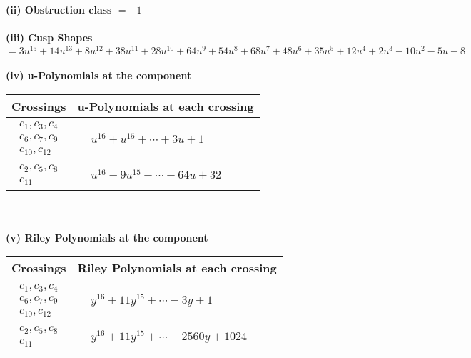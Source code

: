 \documentclass[1p]{elsarticle_modified}
\theoremstyle{definition}
\begin{document}
\flushleft \textbf{(ii) Obstruction class $= -1$}\\~\\
\flushleft \textbf{(iii) Cusp Shapes $= 3 u^{15}+14 u^{13}+8 u^{12}+38 u^{11}+28 u^{10}+64 u^9+54 u^8+68 u^7+48 u^6+35 u^5+12 u^4+2 u^3-10 u^2-5 u-8$}\\~\\
\newpage\renewcommand{\arraystretch}{1}
\flushleft \textbf{(iv) u-Polynomials at the component}\newline \\
\begin{tabular}{m{50pt}|m{274pt}}
Crossings & \hspace{64pt}u-Polynomials at each crossing \\
\hline $$\begin{aligned}c_{1},c_{3},c_{4}\\c_{6},c_{7},c_{9}\\c_{10},c_{12}\end{aligned}$$&$\begin{aligned}
&u^{16}+u^{15}+\cdots+3 u+1
\end{aligned}$\\
\hline $$\begin{aligned}c_{2},c_{5},c_{8}\\c_{11}\end{aligned}$$&$\begin{aligned}
&u^{16}-9 u^{15}+\cdots-64 u+32
\end{aligned}$\\
\hline
\end{tabular}\\~\\
\newpage\renewcommand{\arraystretch}{1}
\flushleft \textbf{(v) Riley Polynomials at the component}\newline \\
\begin{tabular}{m{50pt}|m{274pt}}
Crossings & \hspace{64pt}Riley Polynomials at each crossing \\
\hline $$\begin{aligned}c_{1},c_{3},c_{4}\\c_{6},c_{7},c_{9}\\c_{10},c_{12}\end{aligned}$$&$\begin{aligned}
&y^{16}+11 y^{15}+\cdots-3 y+1
\end{aligned}$\\
\hline $$\begin{aligned}c_{2},c_{5},c_{8}\\c_{11}\end{aligned}$$&$\begin{aligned}
&y^{16}+11 y^{15}+\cdots-2560 y+1024
\end{aligned}$\\
\hline
\end{tabular}\\~\\
\end{document}
